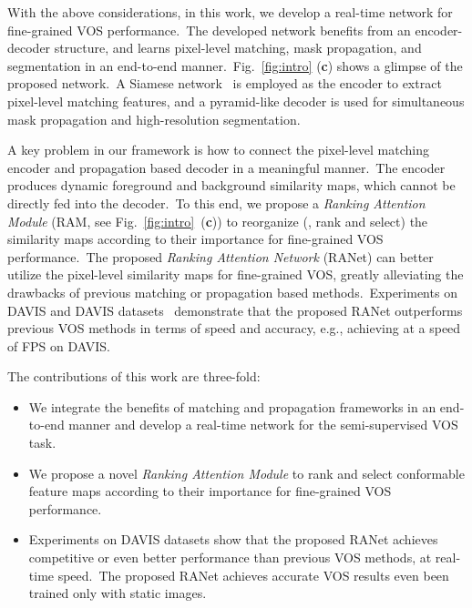 \documentclass[10pt,twocolumn,letterpaper]{article}
\begin{document}
With the above considerations, in this work, we develop a real-time network for fine-grained VOS performance.\ The developed network benefits from an encoder-decoder structure, and learns pixel-level matching, mask propagation, and segmentation in an end-to-end manner.\ Fig.~\ref{fig:intro} (\textbf{c}) shows a glimpse of the proposed network.\ A Siamese network~\cite{siamfc} is employed as the encoder to extract pixel-level matching features, and a pyramid-like decoder is used for simultaneous mask propagation and high-resolution segmentation.\ 
 


A key problem in our framework is how to connect the pixel-level matching encoder and propagation based decoder in a meaningful manner.\ The encoder produces dynamic foreground and background similarity maps, which cannot be directly fed into the decoder.\
To this end, we propose a \emph{Ranking Attention Module} (RAM, see Fig.~\ref{fig:intro}\ (\textbf{c})) to reorganize (\ie, rank and select) the similarity maps according to their importance for fine-grained VOS performance.\ The proposed \emph{Ranking Attention Network} (RANet) can better utilize the pixel-level similarity maps for fine-grained VOS, greatly alleviating the drawbacks of previous matching or propagation based methods.\ Experiments on DAVIS and DAVIS datasets~\cite{davis2016,davis2017} demonstrate that the proposed RANet outperforms previous VOS methods in terms of speed and accuracy, e.g., achieving  at a speed of  FPS on DAVIS.


The contributions of this work are three-fold: 
\vspace{-2mm}
\begin{itemize}
\item
We integrate the benefits of matching and propagation frameworks in an end-to-end manner and develop a real-time network for the semi-supervised VOS task. 
\vspace{-3mm}
\item 
\vspace{-3mm}
We propose a novel \emph{Ranking Attention Module} to rank and select conformable feature maps according to their importance for fine-grained VOS performance.
\vspace{-2mm}
\item 
Experiments on DAVIS datasets show that the proposed RANet achieves competitive or even better performance than previous VOS methods, at real-time speed.\ The proposed RANet achieves accurate VOS results even been trained only with static images.
\end{itemize}
\vspace{-4mm}
\end{document}

